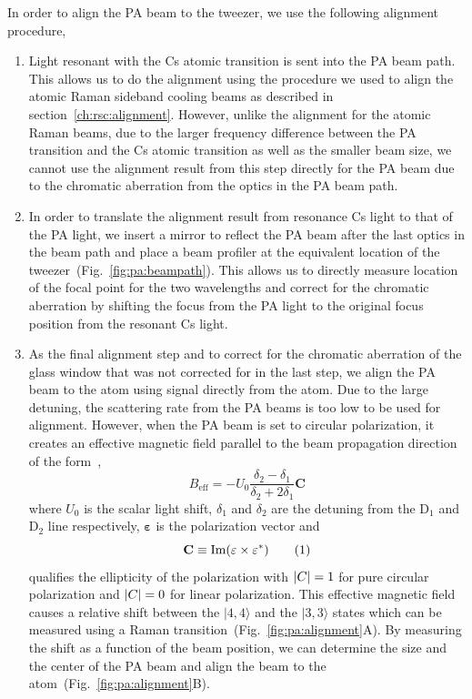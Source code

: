 In order to align the PA beam to the tweezer, we use the following alignment procedure,
\begin{enumerate}
\item Light resonant with the Cs atomic transition is sent into the PA beam path.
  This allows us to do the alignment using the procedure we used to align the
  atomic Raman sideband cooling beams as described in section~\ref{ch:rsc:alignment}.
  However, unlike the alignment for the atomic Raman beams,
  due to the larger frequency difference between the PA transition and the Cs atomic
  transition as well as the smaller beam size,
  we cannot use the alignment result from this step directly for the PA beam
  due to the chromatic aberration from the optics in the PA beam path.
\item In order to translate the alignment result from resonance Cs light to that of the PA light,
  we insert a mirror to reflect the PA beam after the last optics in the beam path
  and place a beam profiler at the equivalent location of
  the tweezer~(Fig.~\ref{fig:pa:beampath}).
  This allows us to directly measure location of the focal point for the two wavelengths
  and correct for the chromatic aberration by shifting the focus from the PA light
  to the original focus position from the resonant Cs light.
\item As the final alignment step and to correct for the chromatic aberration of the
  glass window that was not corrected for in the last step,
  we align the PA beam to the atom using signal directly from the atom.
  Due to the large detuning, the scattering rate from the PA beams
  is too low to be used for alignment.
  However, when the PA beam is set to circular polarization, it creates an effective
  magnetic field parallel to the beam propagation direction
  of the form~\cite{thompson_coherence_2013},
  \[ B_{\mathrm{eff}}=-U_0\frac{\delta_2-\delta_1}{\delta_2+2\delta_1}\mathbf{C} \]
  where $U_0$ is the scalar light shift, $\delta_1$ and $\delta_2$ are the detuning from the
  $\mathrm{D}_1$ and $\mathrm{D}_2$ line respectively,
  $\mathbf{\varepsilon}$ is the polarization vector and
  \[\mathbf{C}\equiv\mathrm{Im}\paren{\mathbf{\varepsilon}\times\mathbf{\varepsilon}^*}
    \numberthis{eq:pa:beampath:def-c}\]
  qualifies the ellipticity of the polarization with
  ${\left|{C}\right|}=1$ for pure circular polarization and ${\left|{C}\right|}=0$ for linear polarization.
  This effective magnetic field causes a relative shift between the $|4,4\rangle$
  and the $|3,3\rangle$ states which can be measured using
  a Raman transition~(Fig.~\ref{fig:pa:alignment}A).
  By measuring the shift as a function of the beam position,
  we can determine the size and the center of the PA beam and align the beam to
  the atom~(Fig.~\ref{fig:pa:alignment}B).
\end{enumerate}

